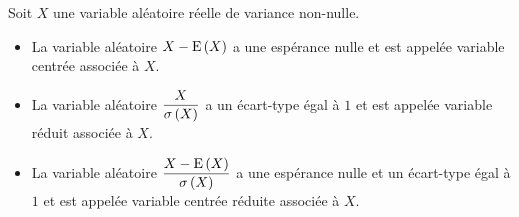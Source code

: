 \begin{defi}
Soit \(X\) une variable aléatoire réelle de variance non-nulle.

\begin{itemize}
    \item La variable aléatoire \(X-\operatorname{E}\left(X\right)\) a une espérance nulle et est appelée variable centrée associée à \(X\). \\
    \item La variable aléatoire \(\dfrac{X}{\sigma\left(X\right)}\) a un écart-type égal à \(1\) et est appelée variable réduit associée à \(X\). \\
    \item La variable aléatoire \(\dfrac{X-\operatorname{E}\left(X\right)}{\sigma\left(X\right)}\) a une espérance nulle et un écart-type égal à \(1\) et est appelée variable centrée réduite associée à \(X\).
\end{itemize}
\end{defi}